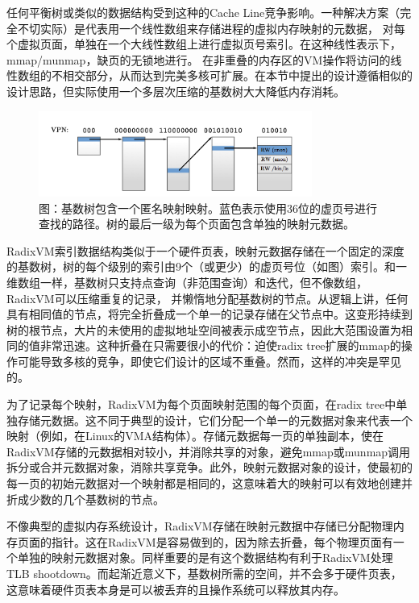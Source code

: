任何平衡树或类似的数据结构受到这种的Cache
Line竞争影响。一种解决方案（完全不切实际）是代表用一个线性数组来存储进程的虚拟内存映射的元数据，
对每个虚拟页面，单独在一个大线性数组上进行虚拟页号索引。在这种线性表示下，mmap/munmap，缺页的无锁地进行。
在非重叠的内存区的VM操作将访问的线性数组的不相交部分，从而达到完美多核可扩展。在本节中提出的设计遵循相似的设计思路，但实际使用一个多层次压缩的基数树大大降低内存消耗。

\begin{figure}[ht]
  \centering
  \includegraphics[width=0.8\textwidth]{figures/appedix_radixvm.png} 
  \caption*{图：基数树包含一个匿名映射映射。蓝色表示使用36位的虚页号进行查找的路径。树的最后一级为每个页面包含单独的映射元数据。}
\end{figure}

RadixVM索引数据结构类似于一个硬件页表，映射元数据存储在一个固定的深度的基数树，树的每个级别的索引由9个（或更少）的虚页号位（如图）索引。和一维数组一样，基数树只支持点查询（非范围查询）和迭代，但不像数组，RadixVM可以压缩重复的记录，
并懒惰地分配基数树的节点。从逻辑上讲，任何具有相同值的节点，将完全折叠成一个单一的记录存储在父节点中。这变形持续到树的根节点，大片的未使用的虚拟地址空间被表示成空节点，因此大范围设置为相同的值非常迅速。这种折叠在只需要很小的代价：迫使radix
tree扩展的mmap的操作可能导致多核的竞争，即使它们设计的区域不重叠。然而，这样的冲突是罕见的。

为了记录每个映射，RadixVM为每个页面映射范围的每个页面，在radix
tree中单独存储元数据。这不同于典型的设计，它们分配一个单一的元数据对象来代表一个映射（例如，在Linux的VMA结构体）。存储元数据每一页的单独副本，使在RadixVM存储的元数据相对较小，并消除共享的对象，避免mmap或munmap调用拆分或合并元数据对象，消除共享竞争。此外，映射元数据对象的设计，使最初的每一页的初始元数据对一个映射都是相同的，这意味着大的映射可以有效地创建并折成少数的几个基数树的节点。

不像典型的虚拟内存系统设计，RadixVM存储在映射元数据中存储已分配物理内存页面的指针。这在RadixVM是容易做到的，因为除去折叠，每个物理页面有一个单独的映射元数据对象。同样重要的是有这个数据结构有利于RadixVM处理TLB
shootdown。而起渐近意义下，基数树所需的空间，并不会多于硬件页表，这意味着硬件页表本身是可以被丢弃的且操作系统可以释放其内存。

